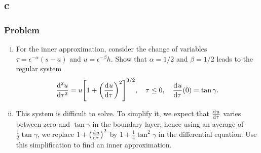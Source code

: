 \documentclass[12pt,twoside]{article}
\begin{document}
\subsection{c}
\label{sec:minilab-part-c}
\subsubsection*{Problem}
\begin{enumerate}[(i)]
\item For the inner approximation, consider the change of variables
  $\tau=\epsilon^{-\alpha}(s-a)$ and $u=\epsilon^{-\beta}h$. Show that
  $\alpha=1/2$ and $\beta=1/2$ leads to the regular system
  \begin{equation}
    \label{eq:minilab-problem-part-c}
    \od[2]{u}{\tau} = u{\left[ 1+{\left( \od{u}{\tau} \right)}^2 \right]}^{3/2},
    \quad \tau\le0,\quad \od{u}{\tau}(0)=\tan\gamma.
  \end{equation}

\item This system is difficult to solve. To simplify it, we expect that
  $\frac{\mathrm{d}^{} {u}}{\mathrm{d}{\tau}^{}}$ varies between zero and $\tan\gamma$ in the boundary layer;
  hence using an average of $\frac{1}{2}\tan\gamma$, we replace
  $1+{\left(\frac{\mathrm{d}^{} {u}}{\mathrm{d}{\tau}^{}}\right)}^2$ by $1+\frac{1}{4}\tan^2\gamma$ in the
  differential equation. Use this simplification to find an inner approximation.
\end{enumerate}
\end{document}
